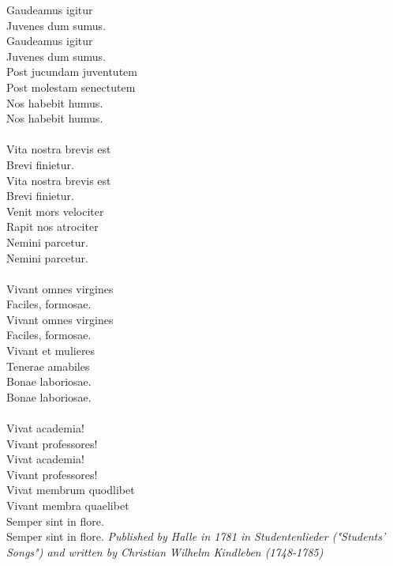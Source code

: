 \vspace{10pt}
\par
Gaudeamus igitur\\
Juvenes dum sumus.\\
Gaudeamus igitur\\
Juvenes dum sumus.\\
Post jucundam juventutem\\
Post molestam senectutem\\
Nos habebit humus.\\
Nos habebit humus.\\
\\
Vita nostra brevis est\\
Brevi finietur.\\
Vita nostra brevis est\\
Brevi finietur.\\
Venit mors velociter\\
Rapit nos atrociter\\
Nemini parcetur.\\
Nemini parcetur.\\
\\
Vivant omnes virgines\\
Faciles, formosae.\\
Vivant omnes virgines\\
Faciles, formosae.\\
Vivant et mulieres\\
Tenerae amabiles\\
Bonae laboriosae.\\
Bonae laboriosae.\\
\\
Vivat academia!\\
Vivant professores!\\
Vivat academia!\\
Vivant professores!\\
Vivat membrum quodlibet\\
Vivant membra quaelibet\\
Semper sint in flore.\\
Semper sint in flore.
\vspace{10pt}
{\footnotesize\textit{Published by Halle in 1781 in Studentenlieder ("Students' Songs") and written by Christian Wilhelm Kindleben (1748-1785)}}
